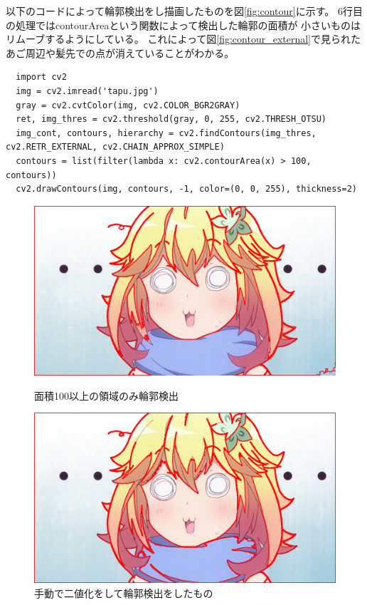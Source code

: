 \documentclass[dvipdfmx]{jsarticle}
\begin{document}
以下のコードによって輪郭検出をし描画したものを図\ref{fig:contour}に示す。
6行目の処理ではcontourAreaという関数によって検出した輪郭の面積が
小さいものはリムーブするようにしている。
これによって図\ref{fig:contour_external}で見られた
あご周辺や髪先での点が消えていることがわかる。

\begin{lstlisting}
  import cv2
  img = cv2.imread('tapu.jpg')
  gray = cv2.cvtColor(img, cv2.COLOR_BGR2GRAY)
  ret, img_thres = cv2.threshold(gray, 0, 255, cv2.THRESH_OTSU)
  img_cont, contours, hierarchy = cv2.findContours(img_thres, cv2.RETR_EXTERNAL, cv2.CHAIN_APPROX_SIMPLE)
  contours = list(filter(lambda x: cv2.contourArea(x) > 100, contours))
  cv2.drawContours(img, contours, -1, color=(0, 0, 255), thickness=2)
\end{lstlisting}

\begin{figure}[htbp]
  \begin{minipage}{0.5\hsize}
    \centering
    \includegraphics[width=0.9\hsize]{../pic/contour2.png}
    \caption{面積100以上の領域のみ輪郭検出}
    \label{fig:contour}
  \end{minipage}
  \begin{minipage}{0.5\hsize}
    \centering
    \includegraphics[width=0.9\hsize]{../pic/contour3.png}
    \caption{手動で二値化をして輪郭検出をしたもの}
    \label{fig:contour2}
  \end{minipage}
\end{figure}
\end{document}
